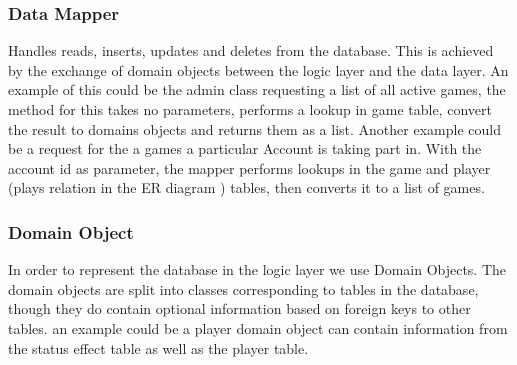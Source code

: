 \subsubsection{Data Mapper} \label{sec:dbImplementation}
Handles reads, inserts, updates and deletes from the database. This is achieved by the exchange of domain objects between the logic layer and the data layer.
An example of this could be the admin class requesting a list of all active games, the method for this takes no parameters, performs a lookup in game table, convert the result to domains objects and returns them as a list.
Another example could be a request for the a games a particular Account is taking part in. With the account id as parameter, the mapper performs lookups in the game and player (plays relation in the ER diagram ) tables, then converts it to a list of games.


\subsubsection{Domain Object} 
In order to represent the database in the logic layer we use Domain Objects. The domain objects are split into classes corresponding to tables in the database, though they do contain optional information based on foreign keys to other tables. an example could be a player domain object can contain information from the status effect table as well as the player table.
